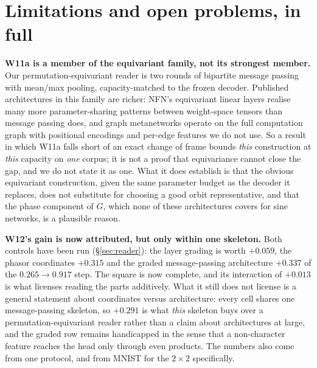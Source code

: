 
\section{Limitations and open problems, in full}\label{app:limits}

\textbf{W11a is a member of the equivariant family, not its strongest member.} Our
permutation-equivariant reader is two rounds of bipartite message passing with mean/max pooling,
capacity-matched to the frozen decoder. Published architectures in this family are richer: NFN's
equivariant linear layers realise many more parameter-sharing patterns between weight-space
tensors than message passing does, and graph metanetworks operate on the full computation graph
with positional encodings and per-edge features we do not use. So a result in which W11a falls
short of an exact change of frame bounds \emph{this} construction at \emph{this} capacity on
\emph{one} corpus; it is not a proof that equivariance cannot close the gap, and we do not state it
as one. What it does establish is that the obvious equivariant construction, given the same
parameter budget as the decoder it replaces, does not substitute for choosing a good orbit representative, and that the phase component of $G$, which none of these architectures covers
for sine networks, is a plausible reason.

\textbf{W12's gain is now attributed, but only within one skeleton.} Both controls have been run
(\S\ref{sec:reader}): the layer grading is worth $+0.059$, the phasor coordinates $+0.315$ and the
graded message-passing architecture $+0.337$ of the $0.265 \to 0.917$ step. The square is now complete, and its interaction of $+0.013$ is what licenses reading the
parts additively. What it still does not license is a general statement about coordinates versus
architecture: every cell shares one message-passing skeleton, so $+0.291$ is what \emph{this}
skeleton buys over a permutation-equivariant reader rather than a claim about architectures at
large, and the graded row remains handicapped in the sense that a non-character feature reaches the
head only through even products. The numbers also come from one protocol, and from MNIST for the
$2\times2$ specifically.


